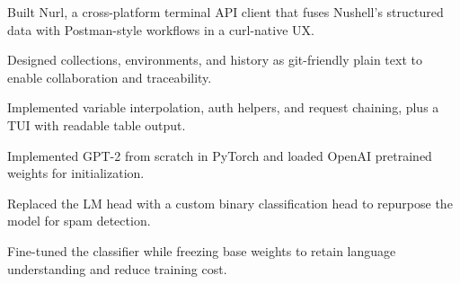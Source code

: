 \documentclass[]{resume-openfont}
\begin{document}
\begin{tightemize}
    \item Built Nurl, a cross-platform terminal API client that fuses Nushell's structured data with Postman-style workflows in a curl-native UX.
    \item Designed collections, environments, and history as git-friendly plain text to enable collaboration and traceability.
    \item Implemented variable interpolation, auth helpers, and request chaining, plus a TUI with readable table output.
\end{tightemize}
\sectionsep

\begin{tightemize}
    \item Implemented GPT-2 from scratch in PyTorch and loaded OpenAI pretrained weights for initialization.
    \item Replaced the LM head with a custom binary classification head to repurpose the model for spam detection.
    \item Fine-tuned the classifier while freezing base weights to retain language understanding and reduce training cost.
\end{tightemize}
\sectionsep
%

\sectionsep

 
\end{document}
